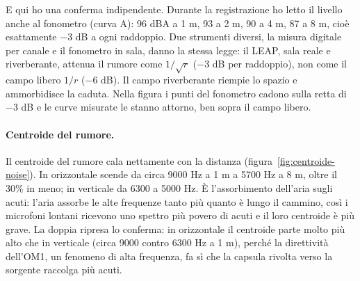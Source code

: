 \documentclass[11pt,a4paper]{article}
\begin{document}
E qui ho una conferma indipendente. Durante la registrazione ho letto il livello anche al
fonometro (curva A): 96 dBA a 1 m, 93 a 2 m, 90 a 4 m, 87 a 8 m, cioè esattamente $-3$ dB a
ogni raddoppio. Due strumenti diversi, la misura digitale per canale e il fonometro in sala,
danno la stessa legge: il LEAP, sala reale e riverberante, attenua il rumore come
$1/\sqrt{r}$ ($-3$ dB per raddoppio), non come il campo libero $1/r$ ($-6$ dB). Il campo
riverberante riempie lo spazio e ammorbidisce la caduta. Nella figura i punti del fonometro
cadono sulla retta di $-3$ dB e le curve misurate le stanno attorno, ben sopra il campo libero.

\paragraph{Centroide del rumore.} Il centroide del rumore cala nettamente con la distanza
(figura~\ref{fig:centroide-noise}). In orizzontale scende da circa 9000 Hz a 1 m a 5700 Hz
a 8 m, oltre il 30\% in meno; in verticale da 6300 a 5000 Hz. È l'assorbimento dell'aria
sugli acuti: l'aria assorbe le alte frequenze tanto più quanto è lungo il cammino, così i
microfoni lontani ricevono uno spettro più povero di acuti e il loro centroide è più grave.
La doppia ripresa lo conferma: in orizzontale il centroide parte molto più alto che in
verticale (circa 9000 contro 6300 Hz a 1 m), perché la direttività dell'OM1, un fenomeno di
alta frequenza, fa sì che la capsula rivolta verso la sorgente raccolga più acuti.
\end{document}
